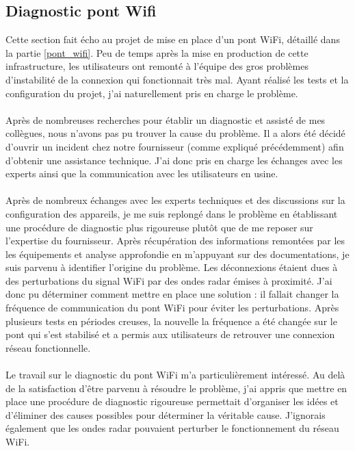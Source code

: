 \documentclass[a4paper,12pt]{report}
\begin{document}
\subsection{Diagnostic pont Wifi} \label{pt-wifi}
Cette section fait écho au projet de mise en place d'un pont WiFi, détaillé dans la partie \ref{pont_wifi}. Peu de temps après la mise en production de cette infrastructure, les utilisateurs ont remonté à l'équipe des gros problèmes d'instabilité de la connexion qui fonctionnait très mal. Ayant réalisé les tests et la configuration du projet, j'ai naturellement pris en charge le problème.
\paragraph{}
Après de nombreuses recherches pour établir un diagnostic et assisté de mes collègues, nous n'avons pas pu trouver la cause du problème. Il a alors été décidé d'ouvrir un incident chez notre fournisseur (comme expliqué précédemment) afin d'obtenir une assistance technique. J'ai donc pris en charge les échanges avec les experts ainsi que la communication avec les utilisateurs en usine.
\paragraph{}
Après de nombreux échanges avec les experts techniques et des discussions sur la configuration des appareils, je me suis replongé dans le problème en établissant une procédure de diagnostic plus rigoureuse plutôt que de me reposer sur l'expertise du fournisseur. Après récupération des informations remontées par les les équipements et analyse approfondie en m'appuyant sur des documentations, je suis parvenu à identifier l'origine du problème. Les déconnexions étaient dues à des perturbations du signal WiFi par des ondes radar émises à proximité. J'ai donc pu déterminer comment mettre en place une solution : il fallait changer la fréquence de communication du pont WiFi pour éviter les perturbations. Après plusieurs tests en périodes creuses, la nouvelle la fréquence a été changée sur le pont qui s'est stabilisé et a permis aux utilisateurs de retrouver une connexion réseau fonctionnelle.
\paragraph{}
Le travail sur le diagnostic du pont WiFi m'a particulièrement intéressé. Au delà de la satisfaction d'être parvenu à résoudre le problème, j'ai appris que mettre en place une procédure de diagnostic rigoureuse permettait d'organiser les idées et d'éliminer des causes possibles pour déterminer la véritable cause. J'ignorais également que les ondes radar pouvaient perturber le fonctionnement du réseau WiFi.
\end{document}
